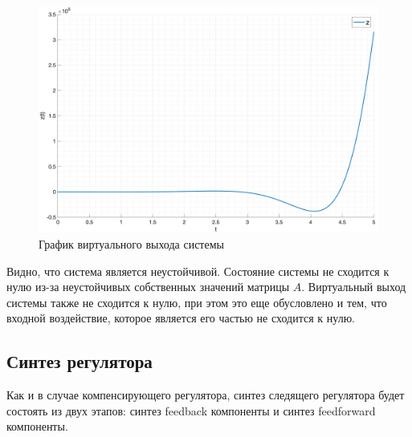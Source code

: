 \begin{figure}[ht!]
    \centering
    \includegraphics[width=\textwidth]{media/plots/task2_open_z.png}
    \caption{График виртуального выхода системы}
    \label{fig:task2_open_z}
\end{figure}
Видно, что система является неустойчивой. Состояние системы не сходится к нулю 
из-за неустойчивых собственных значений матрицы $A$. Виртуальный выход системы 
также не сходится к нулю, при этом это еще обусловлено и тем, что 
входной воздействие, которое является его частью не сходится к нулю. 
\FloatBarrier
\subsection{Синтез регулятора}
Как и в случае компенсирующего регулятора, синтез следящего регулятора 
будет состоять из двух этапов: синтез feedback компоненты и синтез feedforward компоненты. 

